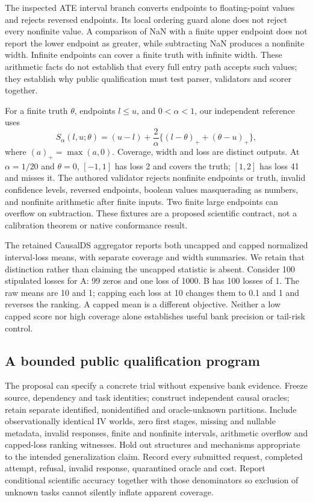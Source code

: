 The inspected ATE interval branch converts endpoints to floating-point values and rejects reversed endpoints. Its local ordering guard alone does not reject every nonfinite value. A comparison of NaN with a finite upper endpoint does not report the lower endpoint as greater, while subtracting NaN produces a nonfinite width. Infinite endpoints can cover a finite truth with infinite width. These arithmetic facts do not establish that every full entry path accepts such values; they establish why public qualification must test parser, validators and scorer together.\citep{exec25_bor_sources,exec25_bor_reference}

For a finite truth $\theta$, endpoints $l\leq u$, and $0<\alpha<1$, our independent reference uses
\[
S_\alpha(l,u;\theta)=(u-l)+\frac{2}{\alpha}
\{(l-\theta)_+ +(\theta-u)_+\},
\]
where $(a)_+=\max(a,0)$. Coverage, width and loss are distinct outputs. At $\alpha=1/20$ and $\theta=0$, $[-1,1]$ has loss 2 and covers the truth; $[1,2]$ has loss 41 and misses it. The authored validator rejects nonfinite endpoints or truth, invalid confidence levels, reversed endpoints, boolean values masquerading as numbers, and nonfinite arithmetic after finite inputs. Two finite large endpoints can overflow on subtraction. These fixtures are a proposed scientific contract, not a calibration theorem or native conformance result.\citep{exec25_bor_reference}

The retained CausalDS aggregator reports both uncapped and capped normalized interval-loss means, with separate coverage and width summaries. We retain that distinction rather than claiming the uncapped statistic is absent. Consider 100 stipulated losses for A: 99 zeros and one loss of 1000. B has 100 losses of 1. The raw means are 10 and 1; capping each loss at 10 changes them to 0.1 and 1 and reverses the ranking. A capped mean is a different objective. Neither a low capped score nor high coverage alone establishes useful bank precision or tail-risk control.\citep{exec25_bor_sources,exec25_bor_reference}

\subsection{A bounded public qualification program}

The proposal can specify a concrete trial without expensive bank evidence. Freeze source, dependency and task identities; construct independent causal oracles; retain separate identified, nonidentified and oracle-unknown partitions. Include observationally identical IV worlds, zero first stages, missing and nullable metadata, invalid responses, finite and nonfinite intervals, arithmetic overflow and capped-loss ranking witnesses. Hold out structures and mechanisms appropriate to the intended generalization claim. Record every submitted request, completed attempt, refusal, invalid response, quarantined oracle and cost. Report conditional scientific accuracy together with those denominators so exclusion of unknown tasks cannot silently inflate apparent coverage.\citep{exec25_bor_reference}

